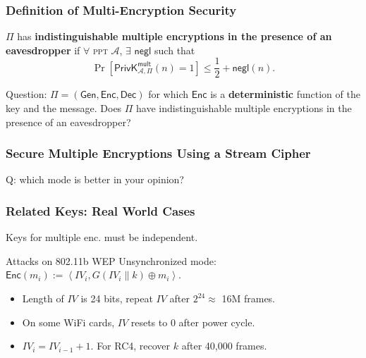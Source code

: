 \begin{frame}\frametitle{Definition of Multi-Encryption Security}
\begin{definition}\label{def:sme}
$\Pi$ has \textbf{indistinguishable multiple encryptions in the presence of an eavesdropper} if $\forall$ \textsc{ppt} $\mathcal{A}$, $\exists$ $\mathsf{negl}$ such that
\[ \Pr\left[\mathsf{PrivK}^{\mathsf{mult}}_{\mathcal{A},\Pi}(n)=1\right] \le \frac{1}{2} + \mathsf{negl}(n).
\]
\end{definition}
\begin{alertblock}{Question:}
$\Pi = (\mathsf{Gen}, \mathsf{Enc}, \mathsf{Dec})$ for which $\mathsf{Enc}$ is a \textbf{deterministic} function of the key and the message.  Does $\Pi$ have indistinguishable multiple encryptions in the presence of an eavesdropper?
\end{alertblock}
\end{frame}
\begin{frame}\frametitle{Secure Multiple Encryptions Using a Stream Cipher}
\begin{figure}
\begin{center}

\end{center}
\end{figure}
\alert{Q: which mode is better in your opinion?}
\end{frame}
\begin{frame}\frametitle{Related Keys: Real World Cases}
Keys for multiple enc. must be independent.
\begin{exampleblock}{Attacks on 802.11b WEP}
Unsynchronized mode: $\mathsf{Enc}(m_i) := \left< IV_i, G(IV_i\|k) \oplus m_i\right>$.\\
\begin{itemize}
\item Length of $IV$ is 24 bits, repeat $IV$ after $2^{24} \approx$ 16M frames.
\item On some WiFi cards, $IV$ resets to $0$ after power cycle.
\item $IV_i = IV_{i-1} + 1$. For RC4, recover $k$ after 40,000 frames.
\end{itemize}
\end{exampleblock}
\end{frame}
